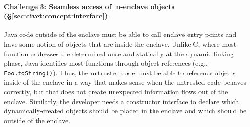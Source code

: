 

\paragraph{\bf Challenge 3: Seamless access of in-enclave objects (\S\ref{sec:civet:concept:interface}).}
Java code outside of the enclave must be able to call enclave entry points and 
have some notion of objects that are inside the enclave.
Unlike C, where most function addresses are determined once and statically
at the dynamic linking phase,  Java identifies most functions through
object references (e.g., {\tt Foo.toString()}).
Thus, the untrusted code must be able to reference
objects inside of the enclave in a way that makes sense when
the untrusted code behaves correctly, but that does not create unexpected information flows 
out of the enclave.
Similarly, the developer needs a constructor interface to declare which dynamically-created
objects should be placed in the enclave and which should be outside of the enclave. 




